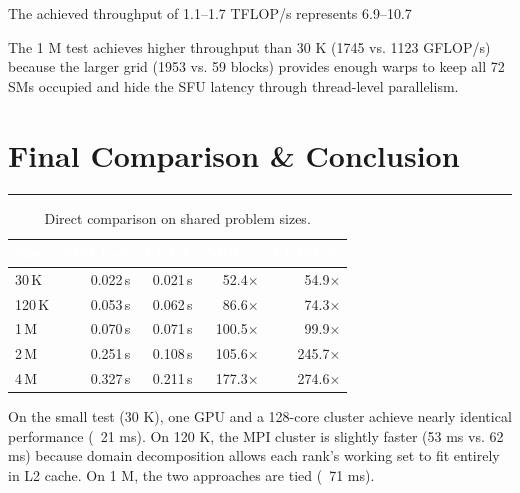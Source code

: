 \documentclass[10pt,dvipsnames,table,twocolumn]{article}
\newcommand{\sectionrule}{\vspace{0.2em}\noindent\textcolor{PaleInk}{\rule{\columnwidth}{0.4pt}}\vspace{0.3em}}
\let\oldsection\section
\renewcommand{\section}[1]{\oldsection{#1}\sectionrule}
\begin{document}
The achieved throughput of 1.1–1.7 TFLOP/s represents 6.9–10.7%

The 1 M test achieves higher throughput than 30 K (1745 vs. 1123 GFLOP/s) because the larger grid (1953 vs. 59 blocks) provides enough warps to keep all 72 SMs occupied and hide the SFU latency through thread-level parallelism.

\section{Final Comparison \& Conclusion}\label{sec:comparison}

\begin{table}[t]
\centering
\caption{Direct comparison on shared problem sizes.}\label{tbl:comparison}
\small
\begin{tabular}{@{}lrrrr@{}}
\rowcolor{TableHead}
\textcolor{white}{\textbf{Size}} &
\textcolor{white}{\textbf{MPI best}} &
\textcolor{white}{\textbf{CUDA}} &
\textcolor{white}{\textbf{MPI $S_p$}} &
\textcolor{white}{\textbf{CUDA $S_p$}} \\
\midrule
30\,K   & 0.022\,s  & 0.021\,s  & 52.4$\times$  & 54.9$\times$  \\
\rowcolor{TableRowAlt}
120\,K  & 0.053\,s  & 0.062\,s  & 86.6$\times$  & 74.3$\times$  \\
1\,M    & 0.070\,s  & 0.071\,s  & 100.5$\times$ & 99.9$\times$  \\
\rowcolor{TableRowAlt}
2\,M    & 0.251\,s  & 0.108\,s  & 105.6$\times$ & 245.7$\times$ \\
4\,M    & 0.327\,s  & 0.211\,s  & 177.3$\times$ & 274.6$\times$ \\
\bottomrule
\end{tabular}
\end{table}

On the small test (30 K), one GPU and a 128-core cluster achieve nearly identical performance (~21 ms). On 120 K, the MPI cluster is slightly faster (53 ms vs. 62 ms) because domain decomposition allows each rank's working set to fit entirely in L2 cache. On 1 M, the two approaches are tied (~71 ms).
\end{document}
